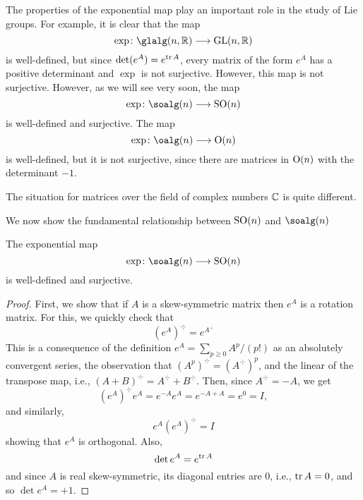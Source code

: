The properties of the exponential map play an important role in the study
of Lie groups. For example, it is clear that the map
\[
\exp\colon\glalg(n,\bbR)\longrightarrow\GL(n,\bbR)
\]
is well-defined, but since $\det(e^A)=e^{\operatorname{tr} A}$, every matrix of the form
$e^A$ has a positive determinant and $\exp$ is not surjective. However,
this map is not surjective. However, as we will see very soon, the map
\[
\exp\colon\soalg(n)\longrightarrow\SO(n)
\]
is well-defined and surjective. The map
\[
\exp\colon\oalg(n)\longrightarrow\Orth(n)
\]
is well-defined, but it is not surjective, since there are matrices in
$\mathrm{O}(n)$ with the determinant $-1$.

The situation for matrices over the field of complex numbers $\mathbb{C}$ is
quite different.

We now show the fundamental relationship between $\mathrm{SO}(n)$ and $\soalg(n)$
\begin{theorem}
The exponential map
\[
  \exp\colon\soalg(n)\longrightarrow\SO(n)
\]
is well-defined and surjective.
\end{theorem}
\begin{proof}
First, we show that if $A$ is a skew-symmetric matrix then $e^A$ is a
rotation matrix. For this, we quickly check that
\[
{(e^A)}^\hermitmatrix=e^{A^\hermitmatrix}
\]
This is a consequence of the definition $e^A=\sum_{p\geq 0}A^p/(p!)$ as an
absolutely convergent series, the observation that
${(A^p)}^\hermitmatrix={(A^\hermitmatrix)}^p$, and the linear of the
transpose map, i.e.,
$(A+B)^\hermitmatrix=A^\hermitmatrix+B^\hermitmatrix$. Then, since
$A^\hermitmatrix=-A$, we get
\[
{(e^A)}^\hermitmatrix e^A=e^{-A}e^A=e^{-A+A}=e^0=I,
\]
and similarly,
\[
e^A{(e^A)}^\hermitmatrix=I
\]
showing that $e^A$ is orthogonal. Also,
\[
\det e^A=e^{\operatorname{tr} A}
\]
and since $A$ is real skew-symmetric, its diagonal entries are $0$, i.e.,
$\operatorname{tr} A=0$, and so $\det e^A=+1$.
\end{proof}

